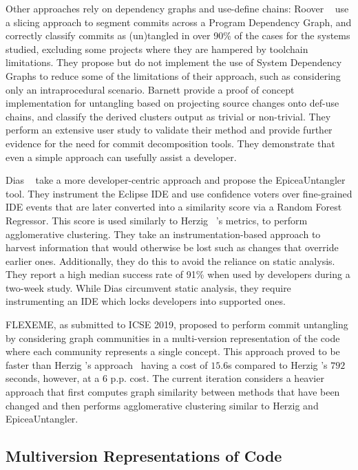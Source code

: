 Other approaches rely on dependency graphs and use-define chains: Roover
\etal~\cite{Roover2017} use a slicing approach to segment commits across a
Program Dependency Graph, and correctly classify commits as (un)tangled in over
90\% of the cases for the systems studied, excluding some projects where they
are hampered by toolchain limitations. They propose but do not implement the use
of System Dependency Graphs to reduce some of the limitations of their approach,
such as considering only an intraprocedural scenario. Barnett \etal
\cite{Barnett2015} provide a proof of concept implementation for untangling
based on projecting source changes onto def-use chains, and classify the derived
clusters output as trivial or non-trivial. They perform an extensive user study
to validate their method and provide further evidence for the need for commit
decomposition tools. They demonstrate that even a simple approach can usefully
assist a developer. 

Dias \etal~\cite{Dias2015} take a more developer-centric approach and propose
the EpiceaUntangler tool. They instrument the Eclipse IDE and use confidence
voters over fine-grained IDE events that are later converted into a similarity
score via a Random Forest Regressor. This score is used similarly to Herzig
\etal~\cite{Herzig2016}'s metrics, \ie to perform agglomerative clustering. They
take an instrumentation-based approach to harvest information that would
otherwise be lost such as changes that override earlier ones. Additionally, they
do this to avoid the reliance on static analysis. They report a high median
success rate of 91\% when used by developers during a two-week study. While Dias
\etal circumvent static analysis, they require instrumenting an IDE which
locks developers into supported ones.

FLEXEME, as submitted to ICSE 2019, proposed to perform commit untangling by
considering graph communities in a multi-version representation of the code
where each community represents a single concept. This approach proved to be
faster than Herzig \etal's approach~\cite{Herzig2016} having a cost of $15.6$s
compared to Herzig \etal's $792$ seconds, however, at a $6$ p.p. cost. The
current iteration considers a heavier approach that first computes graph
similarity between methods that have been changed and then performs
agglomerative clustering similar to Herzig \etal and EpiceaUntangler.

\subsection{Multiversion Representations of Code}
\label{chapter:literature:sec:flexeme_rel_work:multiversion_repr}

